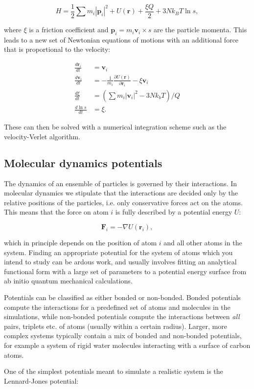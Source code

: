 $$ H = \frac{1}{2} \sum m_i \left| \bm{p}_i \right|^2 + U(\bm{r}) + \frac{\xi Q}{2}
    + 3Nk_B T \ln{s} , $$

where $\xi$ is a friction coefficient and $\bm{p}_i = m_i\bm{v}_i \times s$
are the particle momenta. This leads to a new set of Newtonian equations of motions
with an additional force that is proportional to the velocity:

\begin{equation}
\begin{split}
    \frac{d\bm{r}_i}{dt} &= \bm{v}_i \\
    \frac{d\bm{v}_i}{dt} &= - \frac{1}{m_i} \frac{\partial U(\bm{r})}{\partial \bm{r}_i}
    - \xi \bm{v}_i \\
    \frac{d\xi}{dt} &= \left( \sum m_i \left| \bm{v}_i \right|^2 - 3Nk_b T \right) / Q \\
    \frac{d \ln{s}}{dt} &= \xi .
\end{split}
\end{equation}

These can then be solved with a numerical integration scheme such as the
velocity-Verlet algorithm.

\subsection{Molecular dynamics potentials}
The dynamics of an ensemble of particles is governed by
their interactions. In molecular dynamics we stipulate that
the interactions are decided only by the relative positions
of the particles, i.e. only conservative forces act on the atoms.
This means that the force on atom $i$ is fully described
by a potential energy $U$:

$$ \bm{F}_i = -\nabla U(\bm{r}_i) , $$

which in principle depends on the position of atom $i$
and all other atoms in the system. Finding an appropriate potential
for the system of atoms which you intend to study can be ardous work,
and usually involves fitting an analytical functional form
with a large set of parameters to a potential energy surface
from ab initio quantum mechanical calculations.
\par
Potentials can be classified as either bonded or non-bonded.
Bonded potentials compute the interactions for a predefined
set of atoms and molecules in the simulations, while
non-bonded potentials compute the interactions
between \textit{all} pairs, triplets etc. of atoms
(usually within a certain radius).
Larger, more complex systems typically contain a mix of
bonded and non-bonded potentials, for example a system of rigid water molecules
interacting with a surface of carbon atoms.
\par
One of the simplest potentials meant to simulate a realistic system
is the Lennard-Jones potential:

